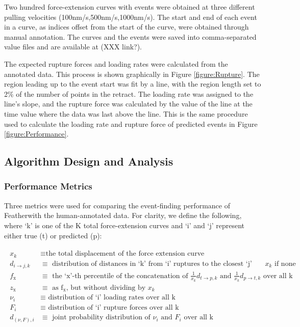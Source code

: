 \documentclass[%
  aip,12pt,tightenlines,
  amsthm,
 amsmath,amssymb
]{article}
\newcommand{\eqs}[1]{
\begin{align*} 
\begin{split}
#1
\end{split}					
\end{align*}}
\newcommand{\fRef}[1]{Figure \ref{figure:#1}}
\newcommand{\sLabel}[1]{\label{section:#1}}
\newcommand{\firstp}[0]{}
\newcommand{\pl}[0]{\vspace{6pt}}
\newcommand{\name}[0]{Feather}
\begin{document}
\firstp Two hundred force-extension curves with events were obtained at three different pulling velocities (100nm/s,500nm/s,1000nm/s). The start and end of each event in a curve, as indices offset from the start of the curve, were obtained through manual annotation. The curves and the events were saved into comma-separated value files and are available at (XXX link?). \pl

The expected rupture forces and loading rates were calculated from the annotated data. This process is shown graphically in \fRef{Rupture}. The region leading up to the event start was fit by a line, with the region length set to 2\% of the number of points in the retract. The loading rate was assigned to the line's slope, and the rupture force was calculated by the value of the line at the time value where the data was last above the line. This is the same procedure used to calculate the loading rate and rupture force of predicted events in \fRef{Performance}. \pl



\subsection{\sLabel{Algorithm}Algorithm Design and Analysis}


\subsubsection{\sLabel{Metrics}Performance Metrics}

\firstp Three metrics were used for comparing the event-finding performance of \name with the human-annotated data. For clarity, we define the following, where `k' is one of the K total force-extension curves and `i' and `j' represent either true (t) or predicted (p): \pl

\eqs{ 
x_k &\equiv \text{the total displacement of the force extension curve} \\
d_{i\rightarrow j,k} &\equiv \text{ distribution of distances in `k' from `i' ruptures to the closest `j' ruptures in or $x_k$ if none } \\
f_{\text{x}} &\equiv \text{ the `x'-th percentile of the concatenation of } \frac{1}{x_k}d_{t\rightarrow p,k} \text{ and } \frac{1}{x_k}d_{p\rightarrow t,k} \text{ over all k } \\
z_{\text{x}} &\equiv \text{ as f$_{\text{x}}$, but without dividing by $x_k$}\\
\nu_i &\equiv \text{ distribution of `i' loading rates over all k} \\
F_i &\equiv \text{ distribution of `i' rupture forces over all k} \\
d_{(\nu,F),i} &\equiv \text{ joint probability distribution of $\nu_i$ and $F_i$ over all k} \\
 }
\end{document}
